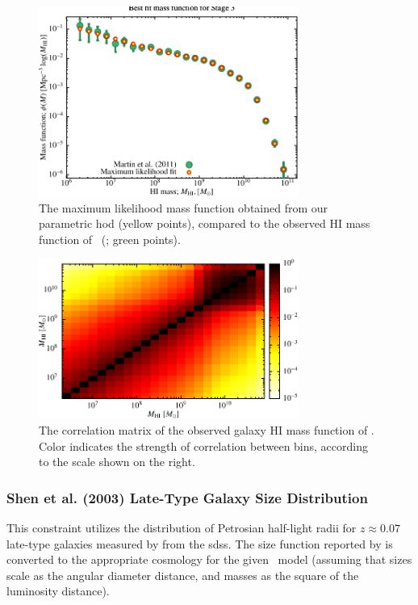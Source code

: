 \begin{figure}
 \includegraphics[width=85mm,trim=0mm 0mm 0mm 2.5mm,clip]{Plots/DataAnalysis/alfalfaHIMassFunctionBestFit.pdf}
 \caption{The maximum likelihood mass function obtained from our parametric \protect\gls{hod} (yellow points), compared to the observed HI mass function of \protect\citeauthor{martin_arecibo_2010}~(\citeyear{martin_arecibo_2010}; green points).}
 \label{fig:MaximumLikelihoodMassFunctionHOD}
\end{figure}

\begin{figure}
 \includegraphics[width=85mm,trim=0mm 0mm 0mm 0mm,clip]{Plots/DataAnalysis/alfalfaHICorrelationmatrix.pdf}
 \caption{The correlation matrix of the observed galaxy HI mass function of \protect\cite{martin_arecibo_2010}. Color indicates the strength of correlation between bins, according to the scale shown on the right.}
 \label{fig:CorrelationMatrixALFALFA}
\end{figure}

\subsubsection{Shen et al. (2003) Late-Type Galaxy Size Distribution}\label{sec:SDSSLateTypeGalaxySizeDistribution}

This constraint utilizes the distribution of Petrosian half-light radii for $z\approx 0.07$ late-type galaxies measured by \cite{shen_size_2003} from the \gls{sdss}. The size function reported by \cite{shen_size_2003} is converted to the appropriate cosmology for the given \glc\ model (assuming that sizes scale as the angular diameter distance, and masses as the square of the luminosity distance).


